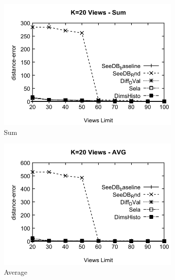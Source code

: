 \begin{figure}[h]
  \begin{subfigure}[b]{0.32\textwidth}
    \includegraphics[width=\textwidth]{SumD2.pdf}
    \caption{Sum}
        \label{fig:SumD2}%
  \end{subfigure}
  \begin{subfigure}[b]{0.32\textwidth}
    \includegraphics[width=\textwidth]{AvgD2.pdf}
     \caption{Average}
        \label{fig:AvgD2}
  \end{subfigure}
  \begin{subfigure}[b]{0.32\textwidth}

\end{subfigure}
\end{figure}
